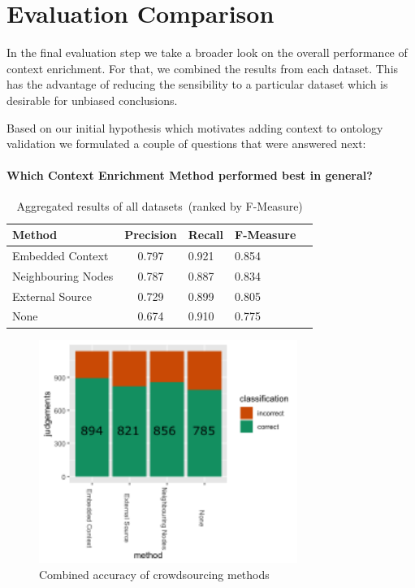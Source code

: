 \section{Evaluation Comparison}\label{sec:result_comparison}
In the final evaluation step we take a broader look on the overall performance of context enrichment. For that, we combined the results from each dataset. This has the advantage of reducing the sensibility to a particular dataset which is desirable for unbiased conclusions. 

Based on our initial hypothesis which motivates adding context to ontology validation we formulated a couple of questions that were answered next:
\paragraph{Which Context Enrichment Method performed best in general?}
\begingroup
\renewcommand{\arraystretch}{1.5}
\begin{table}
	\begin{tabularx}{\textwidth}{l c*{3}{Y}}
		\toprule
		Method & Precision & Recall & F-Measure \\
		\midrule
		 Embedded Context & 0.797 & 0.921 & 0.854 \\
		 Neighbouring Nodes & 0.787 & 0.887 & 0.834 \\
		 External Source & 0.729 & 0.899 & 0.805 \\
		 None & 0.674 & 0.910 & 0.775 \\
		\bottomrule
	\end{tabularx}
	\caption{Aggregated results of all datasets~(ranked by F-Measure)}
	\label{table:bench_p_r_f_combined}
\end{table}
\endgroup

\begin{figure}
	 \centering
	 \includegraphics[width=0.75\textwidth]{plots/comparison/barplot_all_judgements}
	 \caption{Combined accuracy of crowdsourcing methods}\label{fig:results_accuracy_combined}
\end{figure}

